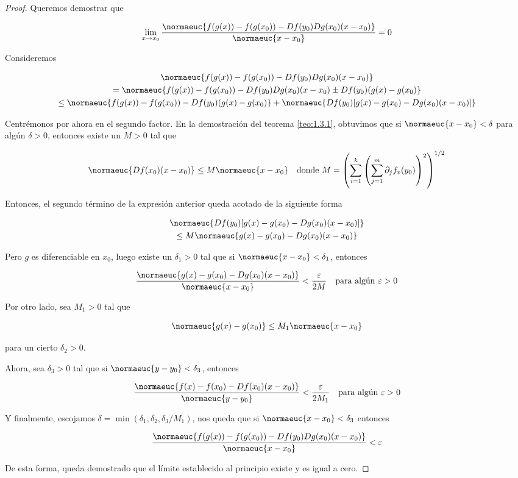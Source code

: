 \begin{proof}
    Queremos demostrar que
    
    \[
    \lim_{x \to x_0} \dfrac{\normaeuc{f(g(x)) - f(g(x_0)) - Df(y_0)Dg(x_0)(x-x_0)}}{\normaeuc{x-x_0}} = 0
    \]
    
    Consideremos
    
    \begin{gather*}
        \normaeuc{f(g(x)) - f(g(x_0)) - Df(y_0)Dg(x_0)(x-x_0)} \\
        = \normaeuc{f(g(x)) - f(g(x_0)) - Df(y_0)Dg(x_0)(x-x_0) \pm Df(y_0)(g(x) - g(x_0)} \\
        \leq \normaeuc{f(g(x)) - f(g(x_0)) - Df(y_0)(g(x) - g(x_0)} + \normaeuc{Df(y_0) [g(x) - g(x_0) - Dg(x_0)(x-x_0)]}
    \end{gather*}
    
    Centrémonos por ahora en el segundo factor. En la demostración del teorema \ref{teo:1.3.1}, obtuvimos que si $\normaeuc{x-x_0} < \delta$ para algún $\delta > 0$, entonces existe un $M > 0$ tal que
    
    \[
    \normaeuc{Df(x_0)(x-x_0)} \leq M \normaeuc{x-x_0} \quad \text{donde $\displaystyle M = \left( \sum_{i=1}^k \left( \sum_{j=1}^m \partial_j f_v (y_0) \right)^2 \right)^{1/2}$}
    \]
    
    Entonces, el segundo término de la expresión anterior queda acotado de la siguiente forma
    
    \begin{gather*}
        \normaeuc{Df(y_0) [g(x) - g(x_0) - Dg(x_0)(x-x_0)]} \\
            \leq M \normaeuc{g(x) - g(x_0) - Dg(x_0)(x-x_0)}
    \end{gather*}
    
    Pero $g$ es diferenciable en $x_0$, luego existe un $\delta_1 > 0$ tal que si $\normaeuc{x - x_0} < \delta_1$, entonces
    
    \[
    \dfrac{\normaeuc{g(x) - g(x_0) - Dg(x_0)(x-x_0)}}{\normaeuc{x-x_0}} < \frac{\varepsilon}{2M} \quad \text{para algún $\varepsilon > 0$}
    \]
    
    Por otro lado, sea $M_1 > 0$ tal que
    
    \[
    \normaeuc{g(x) - g(x_0)} \leq M_1 \normaeuc{x-x_0}
    \]
    
    \noindent para un cierto $\delta_2 > 0$.
    
    Ahora, sea $\delta_3 > 0$ tal que si $\normaeuc{y - y_0} < \delta_3$, entonces
    
    \[
    \dfrac{\normaeuc{f(x) - f(x_0) - Df(x_0)(x-x_0)}}{\normaeuc{y - y_0}} < \frac{\varepsilon}{2M_1} \quad \text{para algún $\varepsilon > 0$}
    \]
    
    Y finalmente, escojamos $\delta = \min(\delta_1, \delta_2, \delta_3 / M_1)$, nos queda que si $\normaeuc{x - x_0} < \delta_3$ entonces
    
    \[
    \dfrac{\normaeuc{f(g(x)) - f(g(x_0)) - Df(y_0)Dg(x_0)(x-x_0)}}{\normaeuc{x-x_0}} < \varepsilon
    \]
    
    De esta forma, queda demostrado que el límite establecido al principio existe y es igual a cero.
\end{proof}